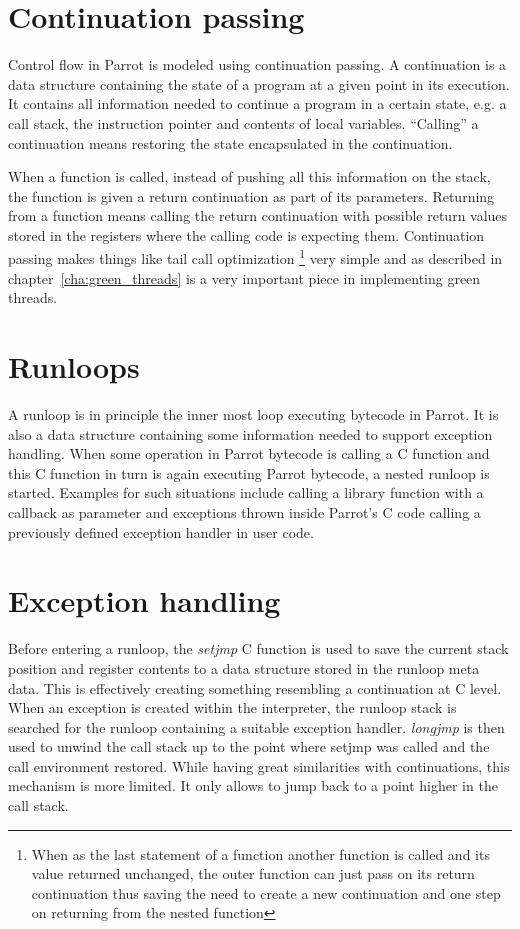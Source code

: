 \documentclass[bachelor,english]{hgbthesis}
\begin{document}
\section{Continuation passing}

Control flow in Parrot is modeled using continuation passing. A continuation is a data structure containing the state of a program at a given point in its execution. It contains all information needed to continue a program in a certain state, e.g. a call stack, the instruction pointer and contents of local variables. ``Calling'' a continuation means restoring the state encapsulated in the continuation.

When a function is called, instead of pushing all this information on the stack, the function is given a return continuation as part of its parameters. Returning from a function means calling the return continuation with possible return values stored in the registers where the calling code is expecting them. Continuation passing makes things like tail call optimization \footnote{When as the last statement of a function another function is called and its value returned unchanged, the outer function can just pass on its return continuation thus saving the need to create a new continuation and one step on returning from the nested function} very simple and as described in chapter~\ref{cha:green_threads} is a very important piece in implementing green threads.

\section{Runloops}
\label{sec:Runloops}

A runloop is in principle the inner most loop executing bytecode in Parrot. It is also a data structure containing some information needed to support exception handling. When some operation in Parrot bytecode is calling a C function and this C function in turn is again executing Parrot bytecode, a nested runloop is started. Examples for such situations include calling a library function with a callback as parameter and exceptions thrown inside Parrot's C code calling a previously defined exception handler in user code.

\section{Exception handling}

Before entering a runloop, the \textit{setjmp} C function is used to save the current stack position and register contents to a data structure stored in the runloop meta data. This is effectively creating something resembling a continuation at C level. When an exception is created within the interpreter, the runloop stack is searched for the runloop containing a suitable exception handler. \textit{longjmp} is then used to unwind the call stack up to the point where setjmp was called and the call environment restored. While having great similarities with continuations, this mechanism is more limited. It only allows to jump back to a point higher in the call stack.
\end{document}
